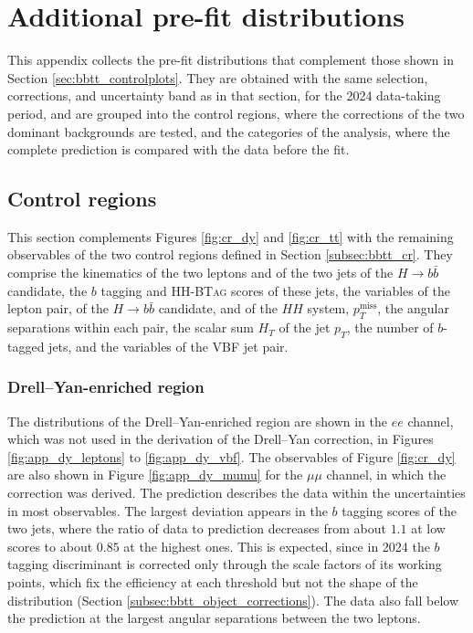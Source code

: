 \chapter{Additional pre-fit distributions}
\label{app:prefit}
%
This appendix collects the pre-fit distributions that complement those shown in Section \ref{sec:bbtt_controlplots}. They are obtained with the same selection, corrections, and uncertainty band as in that section, for the 2024 data-taking period, and are grouped into the control regions, where the corrections of the two dominant backgrounds are tested, and the categories of the analysis, where the complete prediction is compared with the data before the fit.

\section{Control regions}
\label{app:prefit_cr}
%
This section complements Figures \ref{fig:cr_dy} and \ref{fig:cr_tt} with the remaining observables of the two control regions defined in Section \ref{subsec:bbtt_cr}. They comprise the kinematics of the two leptons and of the two jets of the $H\to b\bar{b}$ candidate, the $b$ tagging and \textsc{HH-BTag} scores of these jets, the variables of the lepton pair, of the $H\to b\bar{b}$ candidate, and of the $HH$ system, $p_T^\text{miss}$, the angular separations within each pair, the scalar sum $H_T$ of the jet $p_T$, the number of $b$-tagged jets, and the variables of the VBF jet pair.

\subsection{Drell--Yan-enriched region}
\label{app:prefit_cr_dy}
%
The distributions of the Drell--Yan-enriched region are shown in the $ee$ channel, which was not used in the derivation of the Drell--Yan correction, in Figures \ref{fig:app_dy_leptons} to \ref{fig:app_dy_vbf}. The observables of Figure \ref{fig:cr_dy} are also shown in Figure \ref{fig:app_dy_mumu} for the $\mu\mu$ channel, in which the correction was derived. The prediction describes the data within the uncertainties in most observables. The largest deviation appears in the $b$ tagging scores of the two jets, where the ratio of data to prediction decreases from about $1.1$ at low scores to about $0.85$ at the highest ones. This is expected, since in 2024 the $b$ tagging discriminant is corrected only through the scale factors of its working points, which fix the efficiency at each threshold but not the shape of the distribution (Section \ref{subsec:bbtt_object_corrections}). The data also fall below the prediction at the largest angular separations between the two leptons.

